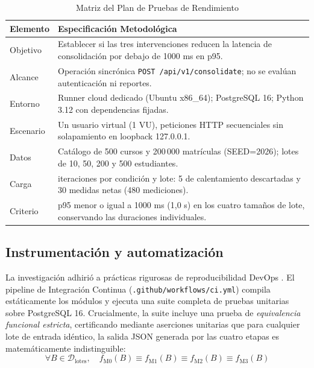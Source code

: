 \documentclass[conference]{IEEEtran}
\begin{document}
\begin{table}[!ht]
\centering
\caption{Matriz del Plan de Pruebas de Rendimiento}
\label{tab:plan_pruebas}
\scriptsize
\setlength{\tabcolsep}{2.2pt}
\begin{tabularx}{\columnwidth}{|>{\raggedright\arraybackslash}p{1.7cm}|>{\raggedright\arraybackslash}X|}
\hline
\textbf{Elemento} & \textbf{Especificación Metodológica} \\
\hline
Objetivo & Establecer si las tres intervenciones reducen la latencia de consolidación por debajo de 1000 ms en p95. \\
\hline
Alcance & Operación sincrónica \texttt{POST /api/v1/consolidate}; no se evalúan autenticación ni reportes. \\
\hline
Entorno & Runner cloud dedicado (Ubuntu x86\_64); PostgreSQL 16; Python 3.12 con dependencias fijadas. \\
\hline
Escenario & Un usuario virtual (1 VU), peticiones HTTP secuenciales sin solapamiento en loopback 127.0.0.1. \\
\hline
Datos & Catálogo de 500 cursos y 200\,000 matrículas (SEED=2026); lotes de 10, 50, 200 y 500 estudiantes. \\
\hline
Carga & 35 iteraciones por condición y lote: 5 de calentamiento descartadas y 30 medidas netas (480 mediciones). \\
\hline
Criterio & p95 menor o igual a 1000 ms (1,0 s) en los cuatro tamaños de lote, conservando las duraciones individuales. \\
\hline
\end{tabularx}
\end{table}

\subsection{Instrumentación y automatización}
La investigación adhirió a prácticas rigurosas de reproducibilidad DevOps \cite{Papadopoulos2021}. El pipeline de Integración Continua (\texttt{.github/workflows/ci.yml}) compila estáticamente los módulos y ejecuta una suite completa de pruebas unitarias sobre PostgreSQL 16. Crucialmente, la suite incluye una prueba de \textit{equivalencia funcional estricta}, certificando mediante aserciones unitarias que para cualquier lote de entrada idéntico, la salida JSON generada por las cuatro etapas es matemáticamente indistinguible:
\begin{equation}
\forall B \in \mathcal{D}_{\text{lotes}}, \quad f_{\text{M0}}(B) \equiv f_{\text{M1}}(B) \equiv f_{\text{M2}}(B) \equiv f_{\text{M3}}(B)
\end{equation}
\end{document}
